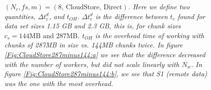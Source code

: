 \documentclass{rspublic}
\begin{document}
\begin{figure}
\begin{center}
\caption{\textit{$(N_c, fs, m) = (\mbox{8, CloudStore, Direct})$. Here
we define two quantities, $\Delta t_c^d$, and $t_{OH}$.  $\Delta
t_c^d$ is the difference between $t_c$ found for  data set sizes 1.15 GB
and 2.3 GB, this is, for chunk sizes $c_s = 144\mbox{MB and }
287\mbox{MB}$.  $t_{OH}$ is the overhead time of working with chunks of
287MB in size vs. 144MB chunks twice. In figure
\ref{Fig:CloudStore287minus144:a} we see that the difference decreased
with the number of workers, but did not scale linearly with $N_w$. In
figure \ref{Fig:CloudStore287minus144:b}, we see that S1 (remote data)
was the one with the most overhead.}}
\label{Fig:CloudStore287minus144}
\end{center}
\end{figure}
\end{document}
